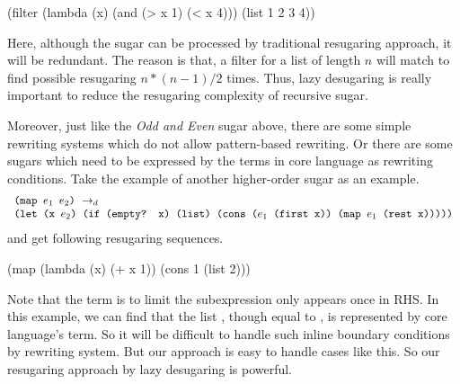 \begin{Codes}
    (filter (lambda (x) (and (> x 1) (< x 4))) (list 1 2 3 4))
\end{Codes}
Here, although the sugar can be processed by traditional resugaring approach, it will be redundant. The reason is that, a filter for a list of length $n$ will match to find possible resugaring $n*(n-1)/2$ times. Thus, lazy desugaring is really important to reduce the resugaring complexity of recursive sugar.

Moreover, just like the \emph{Odd and Even} sugar above, there are some simple rewriting systems which do not allow pattern-based rewriting. Or there are some sugars which need to be expressed by the terms in core language as rewriting conditions. Take the example of another higher-order sugar  as an example.
\[
\begin{array}{l}
\texttt{(map $e_1$ $e_2$)} ~\rightarrow_d~\\
\texttt{(let (x $e_2$) (if (empty? x) (list) (cons ($e_1$ (first x)) (map $e_1$ (rest x)))))}
\end{array}
\]
and get following resugaring sequences.
\begin{Codes}
    (map (lambda (x) (+ x 1)) (cons 1 (list 2)))
\end{Codes}

Note that the  term is to limit the subexpression only appears once in RHS. In this example, we can find that the list , though equal to , is represented by core language's term. So it will be difficult to handle such inline boundary conditions by rewriting system. But our approach is easy to handle cases like this. So our resugaring approach by lazy desugaring is powerful.
